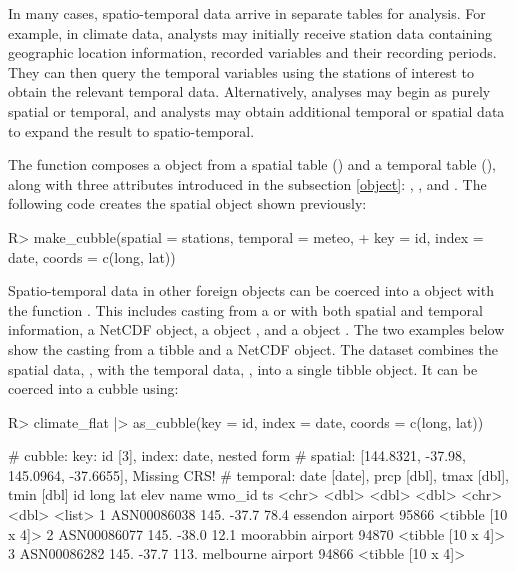 \documentclass[
  shortnames]{jss}
\begin{document}
In many cases, spatio-temporal data arrive in separate tables for analysis. For example, in climate data, analysts may initially receive station data containing geographic location information, recorded variables and their recording periods. They can then query the temporal variables using the stations of interest to obtain the relevant temporal data. Alternatively, analyses may begin as purely spatial or temporal, and analysts may obtain additional temporal or spatial data to expand the result to spatio-temporal.

The function  composes a  object from a spatial table () and a temporal table (), along with three attributes introduced in the subsection \ref{object}: , , and . The following code creates the spatial  object shown previously:

\begin{CodeChunk}
\begin{CodeInput}
R> make_cubble(spatial = stations, temporal = meteo,
+             key = id, index = date, coords = c(long, lat))
\end{CodeInput}
\end{CodeChunk}

Spatio-temporal data in other foreign objects can be coerced into a  object with the function . This includes casting from a  or  with both spatial and temporal information, a NetCDF object, a  object \citep{stars}, and a  object \citep{sftime}. The two examples below show the casting from a tibble and a NetCDF object. The dataset  combines the spatial data, , with the temporal data, , into a single tibble object. It can be coerced into a cubble using:

\begin{CodeChunk}
\begin{CodeInput}
R> climate_flat |> as_cubble(key = id, index = date, coords = c(long, lat))
\end{CodeInput}
\begin{CodeOutput}
# cubble:   key: id [3], index: date, nested form
# spatial:  [144.8321, -37.98, 145.0964, -37.6655], Missing CRS!
# temporal: date [date], prcp [dbl], tmax [dbl], tmin [dbl]
  id           long   lat  elev name              wmo_id ts               
  <chr>       <dbl> <dbl> <dbl> <chr>              <dbl> <list>           
1 ASN00086038  145. -37.7  78.4 essendon airport   95866 <tibble [10 x 4]>
2 ASN00086077  145. -38.0  12.1 moorabbin airport  94870 <tibble [10 x 4]>
3 ASN00086282  145. -37.7 113.  melbourne airport  94866 <tibble [10 x 4]>
\end{CodeOutput}
\end{CodeChunk}
\end{document}
